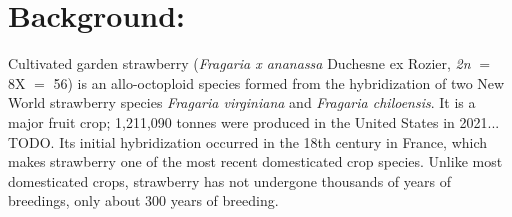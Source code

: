 \documentclass[fleqn,10pt]{olplainarticle}
\begin{document}
\flushbottom
\maketitle
\thispagestyle{empty}

\newpage




% 

\section{Background:}
Cultivated garden strawberry (\textit{Fragaria x ananassa} Duchesne ex Rozier, \textit{2n} $=$ 8X $=$ 56) is an allo-octoploid species formed from the hybridization of two New World strawberry species \textit{Fragaria virginiana} and \textit{Fragaria chiloensis}.
It is a major fruit crop; 1,211,090 tonnes were produced in the United States in 2021... TODO.
Its initial hybridization occurred in the 18th century in France, which makes strawberry one of the most recent domesticated crop species.
Unlike most domesticated crops, strawberry has not undergone thousands of years of breedings, only about 300 years of breeding.
\end{document}
